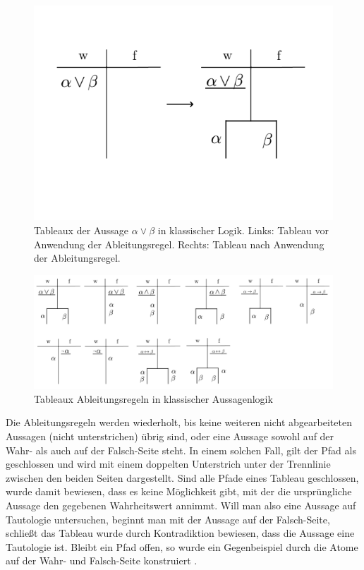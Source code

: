 \begin{figure}[h]
\begin{center}
\includegraphics[scale=0.7]{images/Tableaux_Or_Prop_Logic.png}
\caption{Tableaux der Aussage $\alpha\vee\beta$ in klassischer Logik. Links: Tableau vor Anwendung der Ableitungsregel. Rechts: Tableau nach Anwendung der Ableitungsregel.}
\label{tableaux_prop_or}
\end{center}
\end{figure}

\begin{figure}[h]
\begin{center}
\includegraphics[scale=0.5]{images/Tableaux_Rules_Prop_Logic.png}
\caption{Tableaux Ableitungsregeln in klassischer Aussagenlogik}
\label{tableaux_class_prop_all_rules}
\end{center}
\end{figure}

Die Ableitungsregeln werden wiederholt, bis keine weiteren nicht abgearbeiteten Aussagen (nicht unterstrichen) übrig sind, oder eine Aussage sowohl auf der Wahr- als auch auf der Falsch-Seite steht. In einem solchen Fall, gilt der Pfad als geschlossen und wird mit einem doppelten Unterstrich unter der Trennlinie zwischen den beiden Seiten dargestellt. Sind alle Pfade eines Tableau geschlossen, wurde damit bewiesen, dass es keine Möglichkeit gibt, mit der die ursprüngliche Aussage den gegebenen Wahrheitswert annimmt. Will man also eine Aussage auf Tautologie untersuchen, beginnt man mit der Aussage auf der Falsch-Seite, schließt das Tableau wurde durch Kontradiktion bewiesen, dass die Aussage eine Tautologie ist. Bleibt ein Pfad offen, so wurde ein Gegenbeispiel durch die Atome auf der Wahr- und Falsch-Seite konstruiert \cite{KB14}.

